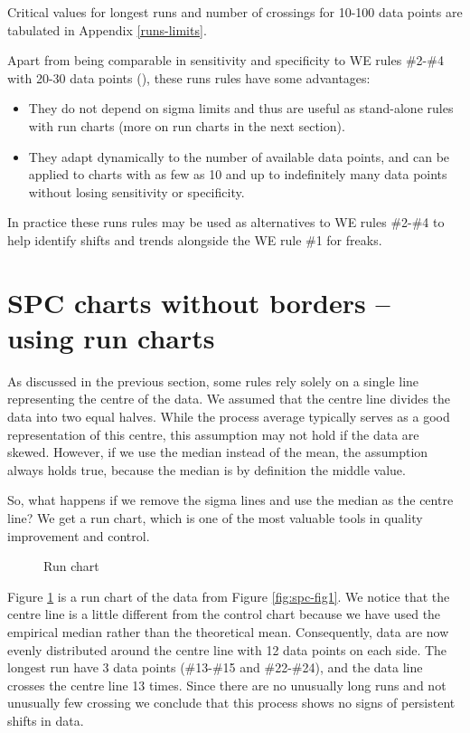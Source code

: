 \documentclass[
]{book}
\makeatletter
\newcommand*\pandocbounded[1]{%
  \sbox\pandoc@box{#1}%
  \Gscale@div\@tempa{\textheight}{\dimexpr\ht\pandoc@box+\dp\pandoc@box\relax}%
  \Gscale@div\@tempb{\linewidth}{\wd\pandoc@box}%
  \ifdim\@tempb\p@<\@tempa\p@\let\@tempa\@tempb\fi%
  \ifdim\@tempa\p@<\p@\scalebox{\@tempa}{\usebox\pandoc@box}%
  \else\usebox{\pandoc@box}%
  \fi%
}
\makeatother
\begin{document}
Critical values for longest runs and number of crossings for 10-100 data points are tabulated in Appendix \ref{runs-limits}.

Apart from being comparable in sensitivity and specificity to WE rules \#2-\#4 with 20-30 data points (), these runs rules have some advantages:

\begin{itemize}
\item
  They do not depend on sigma limits and thus are useful as stand-alone rules with run charts (more on run charts in the next section).
\item
  They adapt dynamically to the number of available data points, and can be applied to charts with as few as 10 and up to indefinitely many data points without losing sensitivity or specificity.
\end{itemize}

In practice these runs rules may be used as alternatives to WE rules \#2-\#4 to help identify shifts and trends alongside the WE rule \#1 for freaks.

\section{SPC charts without borders -- using run charts}\label{spc-charts-without-borders-using-run-charts}

As discussed in the previous section, some rules rely solely on a single line representing the centre of the data. We assumed that the centre line divides the data into two equal halves. While the process average typically serves as a good representation of this centre, this assumption may not hold if the data are skewed. However, if we use the median instead of the mean, the assumption always holds true, because the median is by definition the middle value.

So, what happens if we remove the sigma lines and use the median as the centre line? We get a run chart, which is one of the most valuable tools in quality improvement and control.

\begin{figure}
\centering
\pandocbounded{}
\caption{\label{fig:testing-fig5}Run chart}
\end{figure}

Figure \ref{fig:testing-fig5} is a run chart of the data from Figure \ref{fig:spc-fig1}. We notice that the centre line is a little different from the control chart because we have used the empirical median rather than the theoretical mean. Consequently, data are now evenly distributed around the centre line with 12 data points on each side. The longest run have 3 data points (\#13-\#15 and \#22-\#24), and the data line crosses the centre line 13 times. Since there are no unusually long runs and not unusually few crossing we conclude that this process shows no signs of persistent shifts in data.
\end{document}
